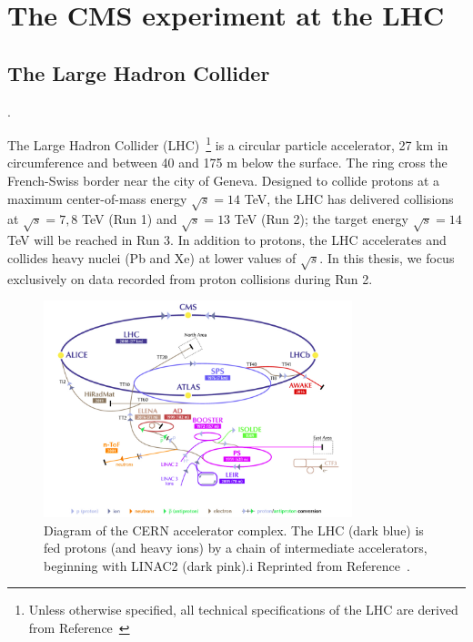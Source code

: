 \chapter{The CMS experiment at the LHC}
\label{sec:cms}

\section{The Large Hadron Collider}
\label{sec:cms:lhc}.

The Large Hadron Collider (LHC)~\cite{lhcjinst}\footnote{Unless otherwise specified, all technical specifications of the LHC are derived from Reference~\cite{lhcjinst}} is a circular particle accelerator, 27 km in circumference and between 40 and 175 m below the surface. 
The ring cross the French-Swiss border near the city of Geneva. 
Designed to collide protons at a maximum center-of-mass energy $\sqrt{s} = 14$ TeV, the LHC has delivered collisions at $\sqrt{s}=7,8$ TeV (Run 1) and $\sqrt{s} = 13$ TeV (Run 2); the target energy $\sqrt{s} = 14$ TeV will be reached in Run 3. 
In addition to protons, the LHC accelerates and collides heavy nuclei (Pb and Xe) at lower values of $\sqrt{s}$. 
In this thesis, we focus exclusively on data recorded from proton collisions during Run 2. 

\begin{figure}[]
    \begin{center}
        \includegraphics[width=0.8\textwidth]{figures/cms/lhc.png}
        \caption{Diagram of the CERN accelerator complex.
                 The LHC (dark blue) is fed protons (and heavy ions) by a chain of intermediate accelerators, beginning with LINAC2 (dark pink).i
                 Reprinted from Reference~\cite{lhcpic}. 
                    }
        \label{fig:cms:lhc}
    \end{center}
\end{figure}

